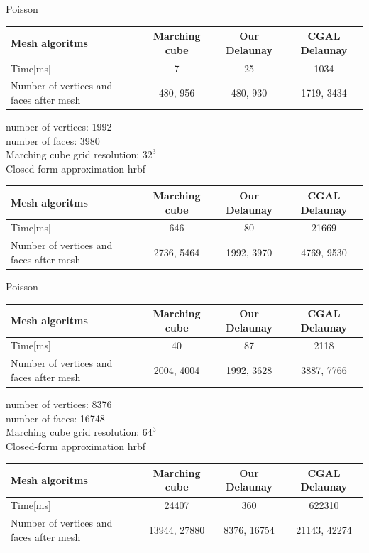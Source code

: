 \documentclass{jsarticle}
\begin{document}
\noindent
Poisson
\begin{table}[htb]
  \begin{tabular}{|l|c|c|c|} \hline
    Mesh algoritms & Marching cube & Our Delaunay & CGAL Delaunay \\  \hline
    Time[ms] & 7 & 25 & 1034\\ \hline
    Number of vertices and faces after mesh & 480, 956 & 480, 930 &1719, 3434 \\ \hline
  \end{tabular}
\end{table}

\noindent
number of vertices: 1992 \\
number of faces: 3980 \\
Marching cube grid resolution: $32^3$\\
Closed-form approximation hrbf\\
\begin{table}[htb]
  \begin{tabular}{|l|c|c|c|} \hline
    Mesh algoritms & Marching cube & Our Delaunay & CGAL Delaunay \\  \hline
    Time[ms] & 646 & 80 & 21669\\ \hline
    Number of vertices and faces after mesh & 2736, 5464 & 1992, 3970 &4769, 9530 \\ \hline
  \end{tabular}
\end{table}

\noindent 
Poisson
\begin{table}[htb]
  \begin{tabular}{|l|c|c|c|} \hline
    Mesh algoritms & Marching cube & Our Delaunay & CGAL Delaunay \\  \hline
    Time[ms] & 40 & 87 & 2118\\ \hline
    Number of vertices and faces after mesh & 2004, 4004 & 1992, 3628 &3887, 7766 \\ \hline
  \end{tabular}
\end{table}

\noindent
number of vertices: 8376 \\
number of faces: 16748 \\
Marching cube grid resolution: $64^3$\\
Closed-form approximation hrbf\\
\begin{table}[htb]
  \begin{tabular}{|l|c|c|c|} \hline
    Mesh algoritms & Marching cube & Our Delaunay & CGAL Delaunay \\  \hline
    Time[ms] & 24407 & 360 & 622310\\ \hline
    Number of vertices and faces after mesh & 13944, 27880 & 8376, 16754 &21143, 42274 \\ \hline
  \end{tabular}
\end{table}
\end{document}
